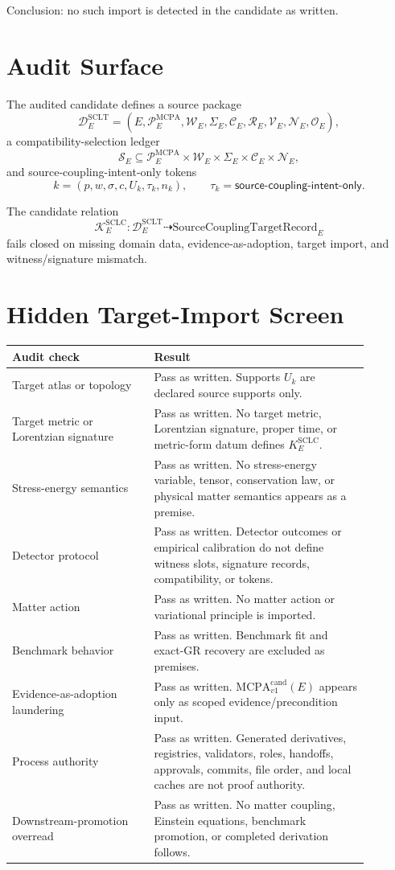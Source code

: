 \documentclass[11pt]{article}
\newcommand{\MCPA}{\mathrm{MCPA}^{\mathrm{cand}}_{v1}}
\newcommand{\SourceCoupRec}{\mathrm{SourceCouplingTargetRecord}}
\begin{document}
Conclusion: no such import is detected in the candidate as written.

\section{Audit Surface}

The audited candidate defines a source package
\[
  \mathcal{D}^{\mathrm{SCLT}}_E =
  (E,\mathcal{P}^{\mathrm{MCPA}}_E,\mathcal{W}_E,\Sigma_E,
  \mathcal{C}_E,\mathcal{R}_E,\mathcal{V}_E,\mathcal{N}_E,\mathcal{O}_E),
\]
a compatibility-selection ledger
\[
  \mathcal{S}_E \subseteq
  \mathcal{P}^{\mathrm{MCPA}}_E \times \mathcal{W}_E \times
  \Sigma_E \times \mathcal{C}_E \times \mathcal{N}_E,
\]
and source-coupling-intent-only tokens
\[
  k=(p,w,\sigma,c,U_k,\tau_k,n_k),
  \qquad
  \tau_k=\mathsf{source\text{-}coupling\text{-}intent\text{-}only}.
\]

The candidate relation
\[
  \mathcal{K}^{\mathrm{SCLC}}_E:
  \mathcal{D}^{\mathrm{SCLT}}_E \dashrightarrow \SourceCoupRec_E
\]
fails closed on missing domain data, evidence-as-adoption, target import, and
witness/signature mismatch.

\section{Hidden Target-Import Screen}

\begin{longtable}{p{0.35\linewidth}p{0.53\linewidth}}
\toprule
Audit check & Result \\
\midrule
Target atlas or topology & Pass as written. Supports \(U_k\) are declared source supports only. \\
Target metric or Lorentzian signature & Pass as written. No target metric, Lorentzian signature, proper time, or metric-form datum defines \(K_E^{\mathrm{SCLC}}\). \\
Stress-energy semantics & Pass as written. No stress-energy variable, tensor, conservation law, or physical matter semantics appears as a premise. \\
Detector protocol & Pass as written. Detector outcomes or empirical calibration do not define witness slots, signature records, compatibility, or tokens. \\
Matter action & Pass as written. No matter action or variational principle is imported. \\
Benchmark behavior & Pass as written. Benchmark fit and exact-GR recovery are excluded as premises. \\
Evidence-as-adoption laundering & Pass as written. \(\MCPA(E)\) appears only as scoped evidence/precondition input. \\
Process authority & Pass as written. Generated derivatives, registries, validators, roles, handoffs, approvals, commits, file order, and local caches are not proof authority. \\
Downstream-promotion overread & Pass as written. No matter coupling, Einstein equations, benchmark promotion, or completed derivation follows. \\
\bottomrule
\end{longtable}
\end{document}
